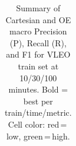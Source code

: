 \begin{table}[t]
{\begin{tabular}{l ccc ccc ccc ccc ccc ccc}
\bottomrule
\end{tabular}%
}
\caption{Summary of Cartesian and OE macro Precision (P), Recall (R), and F1 for VLEO train set at 10/30/100 minutes. Bold = best per train/time/metric. Cell color: red\,=\,low, green\,=\,high.}
\label{tab:class_vleo_energy_feat}
\end{table}
